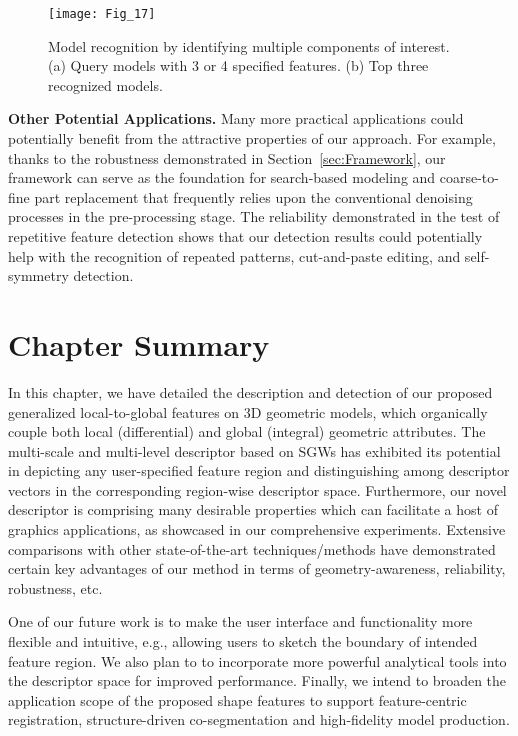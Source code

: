 \begin{figure}[!to]
\begin{center}
\texttt{[image: Fig\_17]}
\end{center}
\caption[Model recognition by identifying multiple components.]
 {Model recognition by identifying multiple components of
 interest. (a) Query models with 3 or 4 specified features.
  (b) Top three recognized models.}
\label{recognition}
\end{figure}

\textbf{Other Potential Applications.} Many more practical applications
could potentially benefit from the attractive properties of our
approach. For example, thanks to the robustness demonstrated in
Section~\ref{sec:Framework}, our framework can serve as the foundation
for search-based modeling and coarse-to-fine part replacement that
frequently relies upon the conventional denoising processes in the
pre-processing stage. The reliability demonstrated in the test of
repetitive feature detection shows that our detection results could
potentially help with the recognition of repeated patterns,
cut-and-paste editing, and self-symmetry detection.

\section{Chapter Summary}
\label{sec:feature:sum}

In this chapter, we have detailed the description and detection of our
proposed generalized local-to-global features on 3D geometric models,
which organically couple both local (differential) and global
(integral) geometric attributes. The multi-scale and multi-level
descriptor based on SGWs has exhibited its potential in depicting any
user-specified feature region and distinguishing among descriptor
vectors in the corresponding region-wise descriptor space.
Furthermore, our novel descriptor is comprising many desirable
properties which can facilitate a host of graphics applications, as
showcased in our comprehensive experiments. Extensive comparisons with
other state-of-the-art techniques/methods have demonstrated certain
key advantages of our method in terms of geometry-awareness,
reliability, robustness, etc.

One of our future work is to make the user interface and functionality
more flexible and intuitive, e.g., allowing users to sketch the boundary of
intended feature region. We also plan to to incorporate more powerful
analytical tools into the descriptor space for improved performance.
Finally, we intend to broaden the application scope of the proposed shape features
to support feature-centric registration, structure-driven co-segmentation
and high-fidelity model production. 